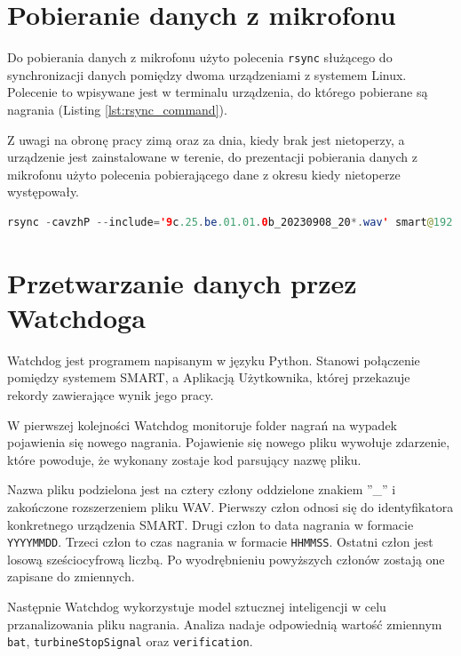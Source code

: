 \documentclass{sprz}
\begin{document}
\section{Pobieranie danych z mikrofonu}
Do pobierania danych z mikrofonu użyto polecenia \verb|rsync| służącego do synchronizacji danych pomiędzy dwoma urządzeniami z systemem Linux. Polecenie to wpisywane jest w terminalu urządzenia, do którego pobierane są nagrania (Listing \ref{lst:rsync_command}).

Z uwagi na obronę pracy zimą oraz za dnia, kiedy brak jest nietoperzy, a urządzenie jest zainstalowane w terenie, do prezentacji pobierania danych z mikrofonu użyto polecenia pobierającego dane z okresu kiedy nietoperze występowały.

\begin{lstlisting}[language=Java,caption={Polecenie rsync pobierające dane z pewnego okresu czasu}, label={lst:rsync_command}]
  rsync -cavzhP --include='9c.25.be.01.01.0b_20230908_20*.wav' smart@192.168.3.2:/var/www/html/storage/devices/9c.25.be.01.01.0b/data/wav/ /home/batmonit/batmonit/recordings/
\end{lstlisting}

\section{Przetwarzanie danych przez Watchdoga}

Watchdog jest programem napisanym w języku Python. Stanowi połączenie pomiędzy systemem SMART, a Aplikacją Użytkownika, której przekazuje rekordy zawierające wynik jego pracy.

W pierwszej kolejności Watchdog monitoruje folder nagrań na wypadek pojawienia się nowego nagrania. Pojawienie się nowego pliku wywołuje zdarzenie, które powoduje, że wykonany zostaje kod parsujący nazwę pliku. 

Nazwa pliku podzielona jest na cztery człony oddzielone znakiem ”\_” i zakończone rozszerzeniem pliku WAV. Pierwszy człon odnosi się do identyfikatora konkretnego urządzenia SMART. Drugi człon to data nagrania w formacie \verb|YYYYMMDD|. Trzeci człon to czas nagrania w formacie \verb|HHMMSS|. Ostatni człon jest losową sześciocyfrową liczbą. Po wyodrębnieniu powyższych członów zostają one zapisane do zmiennych.

Następnie Watchdog wykorzystuje model sztucznej inteligencji w celu przanalizowania pliku nagrania. Analiza nadaje odpowiednią wartość zmiennym \verb|bat|, \verb|turbineStopSignal| oraz \verb|verification|.
\end{document}
